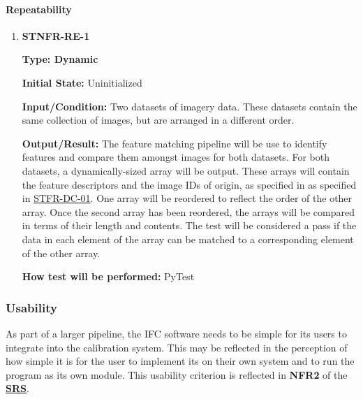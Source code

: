 \documentclass[12pt, titlepage]{article}
\begin{document}
\paragraph{Repeatability}
\begin{enumerate}
\item \hypertarget{STNFR-RE-1}{\textbf{STNFR-RE-1}\\}
\textbf{Type: Dynamic}

\textbf{Initial State:} Uninitialized

\textbf{Input/Condition:} Two datasets of imagery data. These datasets contain the same collection of images, 
but are arranged in a different order.

\textbf{Output/Result:} The feature matching pipeline will be use to identify features and compare them amongst 
images for both datasets. For both datasets, a dynamically-sized array will be output. These arrays will 
contain the feature descriptors and the image IDs of origin, as specified in as specified in 
\hyperlink{STFR-DC-01}{STFR-DC-01}. 
One array will be reordered to reflect the order of the other array. Once the second array has been reordered, 
the arrays will be compared in terms of their length and contents. The test will be considered a pass if the 
data in each element of the array can be matched to a corresponding element of the other array. 

\textbf{How test will be performed:} PyTest
\end{enumerate}

\subsubsection{Usability}
As part of a larger pipeline, the IFC software needs to be simple for its users to integrate into the calibration system. 
This may be reflected in the perception of how simple it is for the user to 
implement its on their own system and to run the program as its own module. This usability criterion is 
reflected in \textbf{NFR2} of the 
\textbf{\href{https://github.com/KiranSingh15/CAS-741-Image-Correspondences/blob/main/docs/SRS/SRS.pdf}
{SRS}}.
\end{document}
